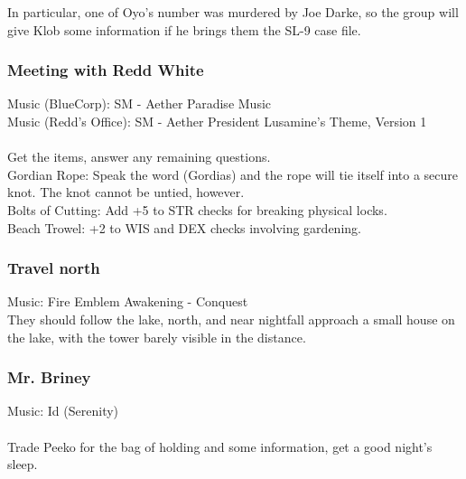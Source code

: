 In particular, one of Oyo's number was murdered by Joe Darke, so the group will give Klob some information if he brings them the SL-9 case file. 

\subsubsection{Meeting with Redd White}
Music (BlueCorp): SM - Aether Paradise Music \\
Music (Redd's Office): SM - Aether President Lusamine's Theme, Version 1 \\
\\
Get the items, answer any remaining questions.\\
Gordian Rope: Speak the word (Gordias) and the rope will tie itself into a secure knot. The knot cannot be untied, however.\\
Bolts of Cutting: Add +5 to STR checks for breaking physical locks.\\
Beach Trowel: +2 to WIS and DEX checks involving gardening.\\

\subsubsection{Travel north}
Music: Fire Emblem Awakening - Conquest\\
They should follow the lake, north, and near nightfall approach a small house on the lake, with the tower barely visible in the distance.

\subsubsection{Mr. Briney}
Music: Id (Serenity) \\
\\
Trade Peeko for the bag of holding and some information, get a good night's sleep.

